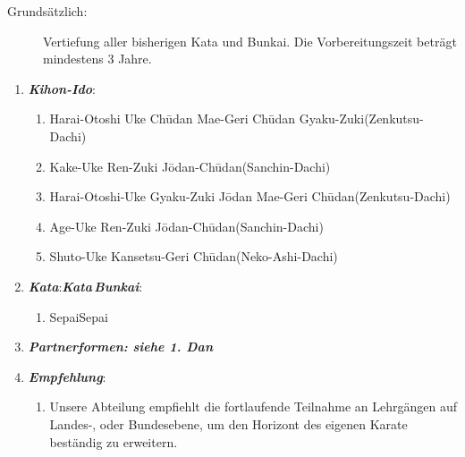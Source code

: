 \documentclass[a5paper,landscape,DIV=calc,11pt,notitlepage]{scrartcl}
\newcommand{\bull}{\,\textbullet\,}
\begin{document}
		\begin{tcolorbox}[colback=white,colframe=black,coltitle=white,title=4. Dan: Schwarz - Yudansha\textit{ - \frqq Der fertige Dan\flqq~- Sensei}]
{\footnotesize 	\begin{description}
		\item[Grundsätzlich:]Vertiefung aller bisherigen Kata und Bunkai. Die Vorbereitungszeit beträgt mindestens 3 Jahre.

\end{description}}
\begin{enumerate}[nosep]
	\item \textit{\textbf{Kihon-Ido}}:
	\begin{enumerate}[nosep]
		\item Harai-Otoshi	Uke\bull Ch\={u}dan Mae-Geri\bull Ch\={u}dan Gyaku-Zuki\tabto{335pt}(Zenkutsu-Dachi)
		\item Kake-Uke\bull Ren-Zuki J\={o}dan-Ch\={u}dan\tabto{335pt}(Sanchin-Dachi)
		\item Harai-Otoshi-Uke\bull Gyaku-Zuki J\={o}dan\bull Mae-Geri Ch\={u}dan\tabto{335pt}(Zenkutsu-Dachi)
		\item Age-Uke\bull Ren-Zuki J\={o}dan-Ch\={u}dan\tabto{335pt}(Sanchin-Dachi)
		\item Shuto-Uke\bull Kansetsu-Geri Ch\={u}dan\tabto{335pt}(Neko-Ashi-Dachi)
	\end{enumerate}
	\vspace{12pt}
	\item \textit{\textbf{Kata}}:\tabto{200pt}\textit{\textbf{Kata\,Bunkai}}:
	\begin{enumerate}[nosep]
		\item Sepai\tabto{200pt}Sepai
	\end{enumerate}
	\vspace{12pt}
	\item \textit{\textbf{Partnerformen: siehe 1. Dan}}
	\vspace{12pt}
	\item \textit{\textbf{Empfehlung}}:
	\begin{enumerate}[nosep]
		\item[] Unsere Abteilung empfiehlt die fortlaufende Teilnahme an Lehrgängen auf Landes-, oder Bundesebene, um den Horizont des eigenen Karate beständig zu erweitern.
	\end{enumerate}
\end{enumerate}
\end{tcolorbox}
\end{document}
